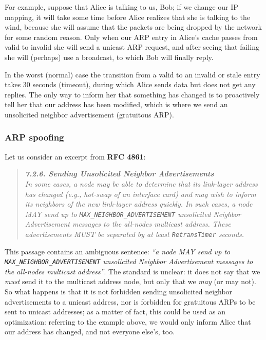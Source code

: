For example, suppose that Alice is talking to us, Bob; if we change our IP mapping, it will take some time before Alice realizes that she is talking to the wind, because she will assume that the packets are being dropped by the network for some random reason. Only when our ARP entry in Alice’s cache passes from valid to invalid she will send a unicast ARP request, and after seeing that failing she will (perhaps) use a broadcast, to which Bob will finally reply.

In the worst (normal) case the transition from a valid to an invalid or stale entry takes 30 seconds (timeout), during which Alice sends data but does not get any replies. The only way to inform her that something has changed is to proactively tell her that our address has been modified, which is where we send an unsolicited neighbor advertisement (gratuitous ARP).

\vspace{0.5em}


\subsubsection{ARP spoofing}
Let us consider an excerpt from \textbf{RFC 4861}:

\begin{quote}
    \centering
    \emph{\textbf{7.2.6. Sending Unsolicited Neighbor Advertisements}\\
In some cases, a node may be able to determine that its link-layer address has changed (e.g., hot-swap of an interface card) and may wish to inform its neighbors of the new link-layer address quickly. In such cases, a node MAY send up to \texttt{MAX\_NEIGHBOR\_ADVERTISEMENT} unsolicited Neighbor Advertisement messages to the all-nodes multicast address. These advertisements MUST be separated by at least \texttt{RetransTimer} seconds.}
\end{quote}

This passage contains an ambiguous sentence: \textit{“a node MAY send up to \texttt{MAX\_NEIGHBOR\_ADVERTISEMENT} unsolicited Neighbor Advertisement messages to the all-nodes multicast address”}. The standard is unclear: it does not say that we \textit{must} send it to the multicast address node, but only that we \textit{may} (or may not). So what happens is that it is not forbidden sending unsolicited neighbor advertisements to a unicast address, nor is forbidden for gratuitous ARPs to be sent to unicast addresses; as a matter of fact, this could be used as an optimization: referring to the example above, we would only inform Alice that our address has changed, and not everyone else's, too.

